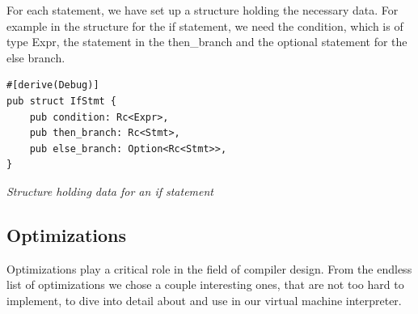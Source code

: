 \documentclass{article}
\begin{document}
For each statement, we have set up a structure holding the necessary data. For example
in the structure for the if statement, we need the condition, which is of type Expr,
the statement in the then\_branch and the optional statement for the else branch.

\begin{verbatim}
#[derive(Debug)]
pub struct IfStmt {
    pub condition: Rc<Expr>,
    pub then_branch: Rc<Stmt>,
    pub else_branch: Option<Rc<Stmt>>,
}
\end{verbatim}
\textit{Structure holding data for an if statement}


\subsection{Optimizations}
Optimizations play a critical role in the field of compiler design. From the
endless list of optimizations we chose a couple interesting ones, that are not
too hard to implement, to dive into detail about and use in our virtual machine
interpreter.
\end{document}
